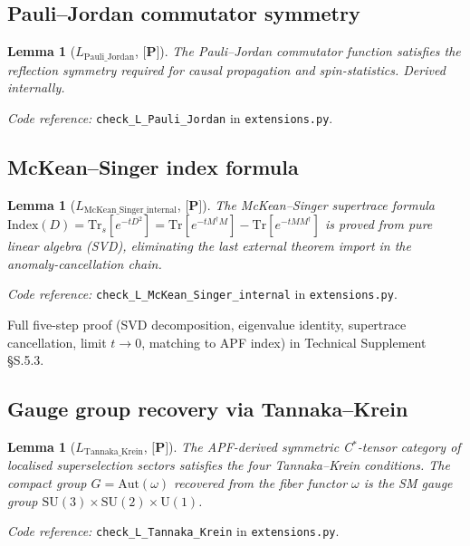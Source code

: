\documentclass[11pt]{article}
\newcommand{\coderef}[2]{\smallskip\noindent\textit{Code reference:} \texttt{#1} in \texttt{#2}.}
\newcommand{\SU}{\mathrm{SU}}
\newcommand{\U}{\mathrm{U}}
\newcommand{\epitag}[1]{\textbf{[#1]}}
\newtheorem{lemma}[theorem]{Lemma}
\theoremstyle{definition}
\begin{document}
\subsection{Pauli--Jordan commutator symmetry}
\begin{lemma}[$L_{\mathrm{Pauli\_Jordan}}$, $\epitag{P}$]
The Pauli--Jordan commutator function satisfies the reflection symmetry required for causal propagation and spin-statistics.  Derived internally.
\end{lemma}

\coderef{check\_L\_Pauli\_Jordan}{extensions.py}

\subsection{McKean--Singer index formula}
\begin{lemma}[$L_{\mathrm{McKean\_Singer\_internal}}$, $\epitag{P}$]
The McKean--Singer supertrace formula $\mathrm{Index}(D) = \mathrm{Tr}_s[e^{-t D^2}] = \mathrm{Tr}[e^{-t M^\dagger M}] - \mathrm{Tr}[e^{-t M M^\dagger}]$ is proved from pure linear algebra (SVD), eliminating the last external theorem import in the anomaly-cancellation chain.
\end{lemma}

\coderef{check\_L\_McKean\_Singer\_internal}{extensions.py}

Full five-step proof (SVD decomposition, eigenvalue identity, supertrace cancellation, limit $t \to 0$, matching to APF index) in Technical Supplement \S S.5.3.

\subsection{Gauge group recovery via Tannaka--Krein}
\begin{lemma}[$L_{\mathrm{Tannaka\_Krein}}$, $\epitag{P}$]
The APF-derived symmetric C$^*$-tensor category of localised superselection sectors satisfies the four Tannaka--Krein conditions.  The compact group $G = \mathrm{Aut}(\omega)$ recovered from the fiber functor $\omega$ is the SM gauge group $\SU(3) \times \SU(2) \times \U(1)$.
\end{lemma}

\coderef{check\_L\_Tannaka\_Krein}{extensions.py}
\end{document}
